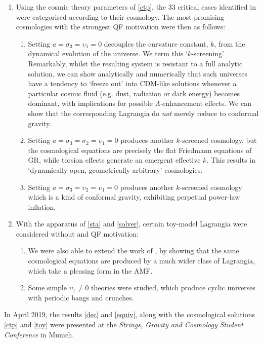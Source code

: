 \documentclass[twoside]{report}
\begin{document}
\begin{multicols}{2}
  \begin{enumerate}[resume]
  \item Using the cosmic theory parameters of \ref{ctp}, the 33 critical cases identified in \cite{2019PhRvD..99f4001L,Lin2} were categorised according to their cosmology. The most promising cosmologies with the strongest QF motivation were then as follows:
    \begin{enumerate}
      \item\label{D} Setting $a=\sigma_3=\upsilon_1=0$ decouples the curvature constant, $k$, from the dynamical evolution of the universe. We term this `$k$-screening'. Remarkably, whilst the resulting system is resistant to a full analytic solution, we can show analytically and numerically that such universes have a tendency to `freeze out' into \textLambda CDM-like solutions whenever a particular cosmic fluid (e.g. dust, radiation or dark energy) becomes dominant, with implications for possible $\Lambda$-enhancement effects. We can show that the corresponding Lagrangia do \textit{not} merely reduce to conformal gravity.
      \item\label{ek} Setting $a=\sigma_3=\sigma_2=\upsilon_1=0$ produces another $k$-screened cosmology, but the cosmological equations are precisely the flat Friedmann equations of GR, while torsion effects generate an emergent effective $k$. This results in `dynamically open, geometrically arbitrary' cosmologies.
      \item\label{inf} Setting $a=\sigma_3=\upsilon_2=\upsilon_1=0$ produces another $k$-screened cosmology which is a kind of conformal gravity, exhibiting perpetual power-law inflation. 
    \end{enumerate}
  \item\label{toy} With the apparatus of \ref{sta} and \ref{solver}, certain toy-model Lagrangia were considered without and QF motivation:
    \begin{enumerate}[resume]
      \item We were also able to extend the work of \cite{lasenby-doran-heineke-2005}, by showing that the same cosmological equations are produced by a much wider class of Lagrangia, which take a pleasing form in the AMF.
      \item Some simple $\upsilon_1\neq 0$ theories were studied, which produce cyclic universes with periodic bangs and crunches.
  \end{enumerate}
\end{enumerate}
In April 2019, the results \ref{dec} and \ref{equiv}, along with the cosmological solutions \ref{ctp} and \ref{toy} were presented \cite{poster} at the \textit{Strings, Gravity and Cosmology Student Conference} in Munich.


\end{multicols}
\end{document}
